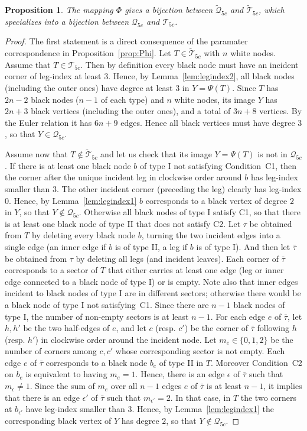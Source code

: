 \documentclass[letter]{amsart}
\numberwithin{theo}{section}
\newtheorem{prop}[theo]{Proposition}
\theoremstyle{remark}
\def\cQ{\mathcal{Q}}
\def\cT{\mathcal{T}}
\def\cQfc{\cQ_{5c}}
\def\cTfc{\cT_{5c}}
\def\wcQfc{\widetilde{\cQ}_{5c}}
\def\wcTfc{\widetilde{\cT}_{5c}}
\def\btau{\bar{\tau}}
\begin{document}
\begin{prop}
The mapping $\Phi$ gives a bijection between $\wcQfc$ and $\wcTfc$, which specializes into a bijection between $\cQfc$ and $\cTfc$.
\end{prop} 
\begin{proof}
The first statement is a direct consequence of the paramater correspondence in Proposition~\ref{prop:Phi}. 
Let $T\in \wcTfc$ with $n$ white nodes.
Assume that $T\in\cTfc$. Then by definition every black node must have an incident corner of leg-index at least $3$. Hence, by Lemma~\ref{lem:legindex2}, all black nodes (including the outer ones) have degree at least $3$ in $Y=\Psi(T)$. Since $T$ has $2n-2$ black nodes ($n-1$ of each type) and $n$ white nodes, its image $Y$ has $2n+3$ black vertices (including the outer ones), and a total of $3n+8$ vertices. By the Euler relation it has $6n+9$ edges. 
Hence all black vertices must have degree $3$, so that $Y\in\cQfc$. 

Assume now that  $T\notin \wcTfc$ and let us check that its image $Y=\Psi(T)$ is not in $\cQfc$. If there is at least one black node $b$ of type I not satisfying Condition~C1, then the corner after the unique incident leg in clockwise order around $b$ has leg-index smaller than $3$. The other incident corner (preceding the leg) clearly has leg-index $0$. Hence, by Lemma~\ref{lem:legindex1} $b$ corresponds to a black vertex of degree $2$ in $Y$, so that $Y\notin \cQfc$. 
Otherwise all black nodes of type I satisfy C1, so that there is at least one black node of type II that does not satisfy C2. 
Let $\tau$ be obtained from $T$ by deleting every black node $b$, turning the two incident edges into a single edge (an inner edge if $b$ is of type II, a leg if $b$ is of type I). And then let $\btau$ be obtained from $\tau$ by deleting all legs (and incident leaves). Each  corner of $\btau$ corresponds to a sector of $T$ that either carries at least one edge (leg or inner edge connected to a black node of type I) or is empty. Note also that inner edges incident to black nodes of type I are in different sectors; otherwise there would be a black node of type I not satisfying~C1. 
Since there are $n-1$ black nodes of type I, the number of non-empty sectors is at least $n-1$. For each edge $e$ of $\btau$, let $h,h'$ be the two half-edges of $e$, and let $c$ (resp. $c'$) be the corner of $\btau$ following $h$ (resp. $h'$) in clockwise order around the incident node. Let $m_e\in\{0,1,2\}$ be the number of corners among $c,c'$ whose corresponding sector is not empty. 
Each edge $e$ of $\btau$ corresponds to a black node $b_e$ of type II in $T$. 
Moreover Condition~C2 on $b_e$ is equivalent to having $m_e=1$. 
Hence, there is an edge $\epsilon$ of $\btau$ such that $m_\epsilon\neq 1$. 
Since the sum of $m_e$ over all $n-1$ edges $e$ of $\btau$ is at least $n-1$, it implies that there is an edge $\epsilon'$ of $\btau$ such that $m_{\epsilon'}=2$. In that case, in $T$ the two corners at $b_{\epsilon'}$ have leg-index smaller than $3$. Hence, by Lemma~\ref{lem:legindex1} the corresponding black vertex of $Y$ has degree $2$, so that $Y\notin\cQfc$. 
\end{proof}
\end{document}

